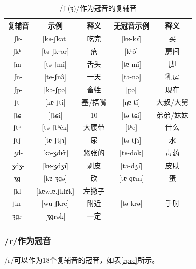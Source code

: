 \begin{table}[H]
\vspace{5pt}
    \centering
    \caption{/ʃ (ʒ)/作为冠音的复辅音}
    \label{sspre}
\begin{tabular}{c|cccc}
     \toprule
复辅音   & 示例              & 释义   & 无冠音示例          & 释义        \\
     \midrule
	ʃk-  & {[}kɐ-ʃkət{]}   & 吃完   & {[}kɐ-kɤ̂{]}  & 买     \\
ʃkʰ- & {[}tə-ʃkʰor{]}  & 疮    & {[}kʰô{]}    & 房间    \\
ʃm-  & {[}tə-ʃmî{]}   & 舌头   & {[}tɐ-mî{]}  & 脚     \\
ʃn-  & {[}te-ʃnə̂{]}   & 一天   & {[}tə-nə{]}   & 乳房    \\
ʃp-  & {[}kə-ʃpə{]}    & 畜牲   & {[}pə{]}      & 现在    \\
ʃt-  & {[}kɐ-ʃti{]}    & 塞/捂嘴 & {[}ŋɐ-tî{]}  & 大叔/大舅 \\
ʃtɕ- & {[}ʃtɕi{]}      & 10   & {[}tə-tɕi{]}  & 弟弟/妹妹 \\
ʃtʰ- & {[}tə-ʃtʰêk{]} & 大腰带  & {[}tʰe{]}     & 什么    \\
ʃtʃ- & {[}tɐ-ʃtʃɿ{]}   & 尿    & {[}tə-tʃɿ{]}  & 水     \\
ʒd-  & {[}kə-ʒdɐ̂r{]}  & 紧张的  & {[}tɐ-dok{]}  & 毒药    \\
ʒdʒ- & {[}kɐ-ʒdʒɿ̂{]}  & 剥皮   & {[}tə-dʒɿ̂{]} & 皮肤    \\
ʒɡ-  & {[}kɐ-ʒɡə{]}    & 砍    & {[}tɐ-ɡɐm{]}  & 蛋    \\ 
ʃkl- & {[}kɐwlɐ.ʃklɐ̂k{]} & 左撇子  &               &       \\
ʃkr- & {[}wu-ʃkre{]}      & 附近   & {[}tə-krə{]}  & 手肘    \\
ʒɡr- & {[}ʒɡrək{]}        & 一定   &               &       \\
   \bottomrule
\end{tabular}
\end{table}

\subsubsection{/r/作为冠音}

/r/可以作为18个复辅音的冠音，如表\ref{rpre}所示。

